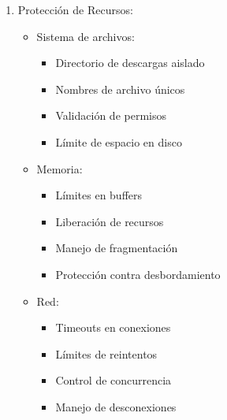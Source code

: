 \documentclass[12pt]{article}
\begin{document}
\begin{enumerate}
    \item Protección de Recursos:
    \begin{itemize}
        \item Sistema de archivos:
        \begin{itemize}
            \item Directorio de descargas aislado
            \item Nombres de archivo únicos
            \item Validación de permisos
            \item Límite de espacio en disco
        \end{itemize}
        \item Memoria:
        \begin{itemize}
            \item Límites en buffers
            \item Liberación de recursos
            \item Manejo de fragmentación
            \item Protección contra desbordamiento
        \end{itemize}
        \item Red:
        \begin{itemize}
            \item Timeouts en conexiones
            \item Límites de reintentos
            \item Control de concurrencia
            \item Manejo de desconexiones
        \end{itemize}
    \end{itemize}


\end{enumerate}
\end{document}
